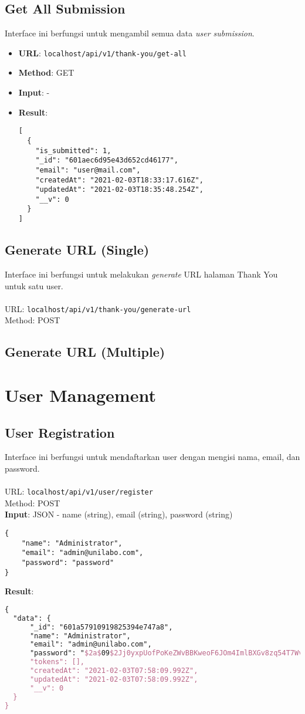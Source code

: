 \documentclass[a4paper]{report}
\begin{document}
\subsection{Get All Submission}
Interface ini berfungsi untuk mengambil semua data \textit{user submission}.
\begin{itemize}
  \item \textbf{URL}: \verb|localhost/api/v1/thank-you/get-all|
  \item \textbf{Method}: GET
  \item \textbf{Input}: -
  \item \textbf{Result}:
    \begin{lstlisting}
[
  {
    "is_submitted": 1,
    "_id": "601aec6d95e43d652cd46177",
    "email": "user@mail.com",
    "createdAt": "2021-02-03T18:33:17.616Z",
    "updatedAt": "2021-02-03T18:35:48.254Z",
    "__v": 0
  }
]
    \end{lstlisting}
\end{itemize}
\subsection{Generate URL (Single)}
          Interface ini berfungsi untuk melakukan \textit{generate} URL halaman Thank You untuk satu user. \\ \\
          URL: \verb|localhost/api/v1/thank-you/generate-url| \\
          Method: POST
\subsection{Generate URL (Multiple)}


\section{User Management}
\subsection{User Registration}
          Interface ini berfungsi untuk mendaftarkan user dengan mengisi nama, email, dan password. \\ \\
          URL: \verb|localhost/api/v1/user/register| \\
          Method: POST \\
          \textbf{Input}: JSON - name (string), email (string), password (string)
            \begin{lstlisting}
{
    "name": "Administrator",
    "email": "admin@unilabo.com",
    "password": "password"
}
            \end{lstlisting}
                    \textbf{Result}: 
            \begin{lstlisting}[language=TeX]
{
  "data": {
      "_id": "601a57910919825394e747a8",
      "name": "Administrator",
      "email": "admin@unilabo.com",
      "password": "$2a$09$2Jj0yxpUofPoKeZWvBBKweoF6JOm4ImlBXGv8zq54T7WvwNueiTyy",
      "tokens": [],
      "createdAt": "2021-02-03T07:58:09.992Z",
      "updatedAt": "2021-02-03T07:58:09.992Z",
      "__v": 0
  }
}
            \end{lstlisting}
\end{document}
